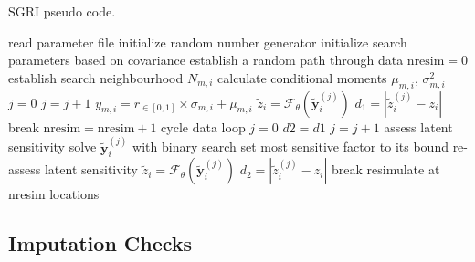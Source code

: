 \begin{algorithm}
    \caption{SGRI pseudo code.}\label{alg:sgri}
    \begin{algorithmic}[1]
        \State read parameter file
        \State initialize random number generator
        \State initialize search parameters based on covariance
         
        \State establish a random path through data
        \State $\text{nresim} = 0$
         
         
        \State establish search neighbourhood $N_{m,i}$
        \State calculate conditional moments $\mu_{m,i}$, $\sigma_{m,i}^{2}$
        \EndFor {}
        \State $j = 0$
         
        \State $j = j + 1$
        \State $y_{m, i} = r_{\in[0,1]} \times \sigma_{m,i} + \mu_{m,i}$ 
        \EndFor
        \State $\tilde{z}_{i} = \mathcal{F}_{\theta}(\tilde{\mathbf{y}}_{i}^{{(j)}})$
        \State $d_{1} = |\tilde{z}_{i}^{(j)} - z_{i}|$ 
        \State break
        \EndIf
        \EndWhile {}
        \State $\text{nresim} = \text{nresim} + 1$
        \State cycle data loop
        \EndIf
        \State $j = 0$
        \State $d2 = d1$
         
        \State $j = j + 1$
        \State assess latent sensitivity
        \State solve $\tilde{\mathbf{y}}_{i}^{(j)}$ with binary search
        \Else
        \State set most sensitive factor to its bound
        \State re-assess latent sensitivity
        \EndIf
        \State $\tilde{z}_{i} = \mathcal{F}_{\theta}(\tilde{\mathbf{y}}_{i}^{(j)})$
        \State $d_{2} = |\tilde{z}_{i}^{(j)} - z_{i}|$ 
        \State break
        \EndIf
        \EndWhile {}
        \EndFor {}
        \State resimulate at nresim locations
        \EndIf
        \EndFor {}
    \end{algorithmic}
\end{algorithm}


\FloatBarrier
\subsection{Imputation Checks}
\label{subsec:impcheck}


